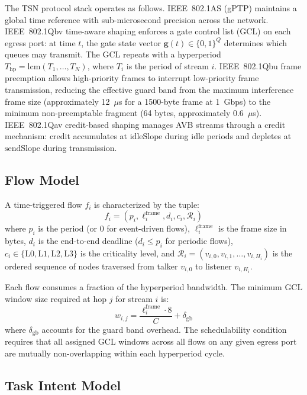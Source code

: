 \documentclass[conference]{IEEEtran}
\begin{document}
The TSN protocol stack operates as follows. IEEE~802.1AS (gPTP) maintains a global time reference with sub-microsecond precision across the network. IEEE~802.1Qbv time-aware shaping enforces a gate control list (GCL) on each egress port: at time $t$, the gate state vector $\mathbf{g}(t) \in \{0,1\}^Q$ determines which queues may transmit. The GCL repeats with a hyperperiod $T_{\text{hp}} = \text{lcm}(T_1, \ldots, T_N)$, where $T_i$ is the period of stream $i$. IEEE~802.1Qbu frame preemption allows high-priority frames to interrupt low-priority frame transmission, reducing the effective guard band from the maximum interference frame size (approximately 12~$\mu$s for a 1500-byte frame at 1~Gbps) to the minimum non-preemptable fragment (64 bytes, approximately 0.6~$\mu$s). IEEE~802.1Qav credit-based shaping manages AVB streams through a credit mechanism: credit accumulates at $\text{idleSlope}$ during idle periods and depletes at $\text{sendSlope}$ during transmission.

\subsection{Flow Model}

A time-triggered flow $f_i$ is characterized by the tuple:
\begin{equation}
f_i = (p_i, \ell_i^{\text{frame}}, d_i, c_i, \mathcal{R}_i)
\end{equation}
where $p_i$ is the period (or 0 for event-driven flows), $\ell_i^{\text{frame}}$ is the frame size in bytes, $d_i$ is the end-to-end deadline ($d_i \leq p_i$ for periodic flows), $c_i \in \{\text{L0}, \text{L1}, \text{L2}, \text{L3}\}$ is the criticality level, and $\mathcal{R}_i = (v_{i,0}, v_{i,1}, \ldots, v_{i,H_i})$ is the ordered sequence of nodes traversed from talker $v_{i,0}$ to listener $v_{i,H_i}$.

Each flow consumes a fraction of the hyperperiod bandwidth. The minimum GCL window size required at hop $j$ for stream $i$ is:
\begin{equation}
w_{i,j} = \frac{\ell_i^{\text{frame}} \cdot 8}{C} + \delta_{\text{gb}}
\end{equation}
where $\delta_{\text{gb}}$ accounts for the guard band overhead. The schedulability condition requires that all assigned GCL windows across all flows on any given egress port are mutually non-overlapping within each hyperperiod cycle.

\subsection{Task Intent Model}
\end{document}

